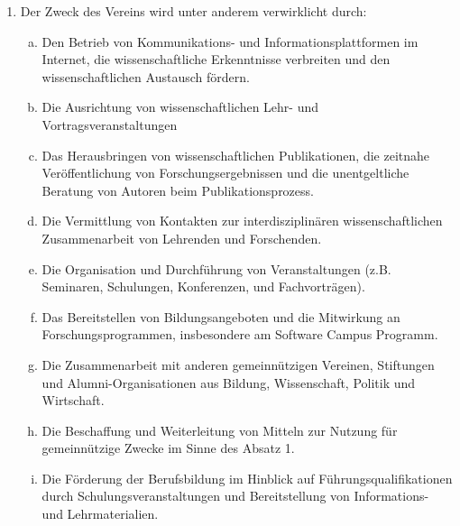 \documentclass{article}
\begin{document}
\begin{enumerate}[§ 1.]
\begin{enumerate}[1.]
	\item Der Zweck des Vereins wird unter anderem verwirklicht durch:
		\begin{enumerate}[a.]
		\item Den Betrieb von Kommunikations- und Informationsplattformen im Internet,
			die wissenschaftliche Erkenntnisse verbreiten und den wissenschaftlichen Austausch fördern.
		\item Die Ausrichtung von wissenschaftlichen Lehr- und Vortragsveranstaltungen
		\item Das Herausbringen von wissenschaftlichen Publikationen, 
		die zeitnahe Veröffentlichung von Forschungsergebnissen
		und die unentgeltliche Beratung von Autoren beim Publikationsprozess.
		\item Die Vermittlung von Kontakten zur interdisziplinären wissenschaftlichen Zusammenarbeit von Lehrenden und Forschenden.
		\item Die Organisation und Durchführung von Veranstaltungen
			(z.B. Seminaren, Schulungen, Konferenzen, und Fachvorträgen).
		\item Das Bereitstellen von Bildungsangeboten und die Mitwirkung an Forschungsprogrammen, insbesondere am Software Campus Programm.
		\item Die Zusammenarbeit mit anderen gemeinnützigen Vereinen, Stiftungen und Alumni-Organisationen
			aus Bildung, Wissenschaft, Politik und Wirtschaft.
		\item Die Beschaffung und Weiterleitung von Mitteln zur Nutzung für gemeinnützige Zwecke im Sinne des Absatz 1.
		\item Die Förderung der Berufsbildung im Hinblick auf Führungsqualifikationen durch Schulungsveranstaltungen
			und Bereitstellung von Informations- und Lehrmaterialien.
		\end{enumerate}
	\end{enumerate}


\end{enumerate}
\end{document}
